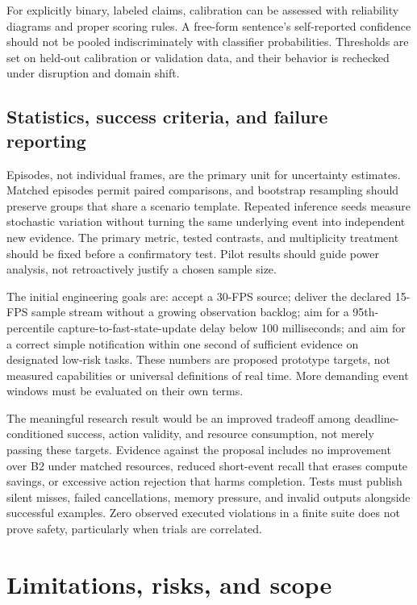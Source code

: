 \documentclass[11pt,letterpaper]{article}
\begin{document}
For explicitly binary, labeled claims, calibration can be assessed with reliability diagrams and proper scoring rules. A free-form sentence's self-reported confidence should not be pooled indiscriminately with classifier probabilities. Thresholds are set on held-out calibration or validation data, and their behavior is rechecked under disruption and domain shift.

\subsection{Statistics, success criteria, and failure reporting}
Episodes, not individual frames, are the primary unit for uncertainty estimates. Matched episodes permit paired comparisons, and bootstrap resampling should preserve groups that share a scenario template. Repeated inference seeds measure stochastic variation without turning the same underlying event into independent new evidence. The primary metric, tested contrasts, and multiplicity treatment should be fixed before a confirmatory test. Pilot results should guide power analysis, not retroactively justify a chosen sample size.

The initial engineering goals are: accept a 30-FPS source; deliver the declared 15-FPS sample stream without a growing observation backlog; aim for a 95th-percentile capture-to-fast-state-update delay below 100 milliseconds; and aim for a correct simple notification within one second of sufficient evidence on designated low-risk tasks. These numbers are proposed prototype targets, not measured capabilities or universal definitions of real time. More demanding event windows must be evaluated on their own terms.

The meaningful research result would be an improved tradeoff among deadline-conditioned success, action validity, and resource consumption, not merely passing these targets. Evidence against the proposal includes no improvement over B2 under matched resources, reduced short-event recall that erases compute savings, or excessive action rejection that harms completion. Tests must publish silent misses, failed cancellations, memory pressure, and invalid outputs alongside successful examples. Zero observed executed violations in a finite suite does not prove safety, particularly when trials are correlated.

\section{Limitations, risks, and scope}
\end{document}
